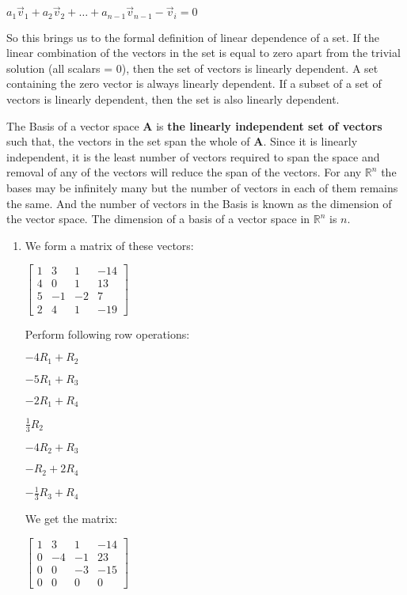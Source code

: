 \documentclass[a4paper, 11pt]{article}
\begin{document}
\begin{enumerate}
\begin{center}
$a_1 \vec v_1 + a_2 \vec v_2 + \dots + a_{n-1} \vec v_{n-1} - \vec v_i = 0$
\end{center} 

So this brings us to the formal definition of linear dependence of a set. If the linear combination of the vectors in the set is equal to zero apart from the trivial solution (all scalars = 0), then the set of vectors is linearly dependent. A set containing the zero vector is always linearly dependent. If a subset of a set of vectors is linearly dependent, then the set is also linearly dependent. \cite{LinInd}

The Basis of a vector space $\textbf{A}$ is \textbf{the linearly independent set of vectors} such that, the vectors in the set span the whole of $\textbf{A}$. Since it is linearly independent, it is the least number of vectors required to span the space and removal of any of the vectors will reduce the span of the vectors. For any $\mathds{R}^n$ the bases may be infinitely many but the number of vectors in each of them remains the same. And the number of vectors in the Basis is known as the dimension of the vector space. The dimension of a basis of a vector space in $\mathds{R}^n$ is $n$. \cite{dimBases}

\begin{enumerate}[label=\alph*)]
\item 
We form a matrix of these vectors: 

$
\begin{bmatrix}
1 & 3 & 1 & -14 \\
4 & 0 & 1 & 13 \\
5 & -1 & - 2 & 7 \\
2 & 4 & 1 & -19
\end{bmatrix}
$

Perform following row operations: 

\begin{center}
$-4R_1 + R_2 $

$-5R_1 + R_3$

$-2R_1 + R_4$

$\frac{1}{3} R_2$

$-4R_2 + R_3$

$-R_2 + 2R_4$

$-\frac{1}{3}R_3 + R_4$
\end{center}

We get the matrix:

$
\begin{bmatrix}
1 & 3 & 1 & -14 \\
0 & -4 & -1 & 23 \\
0 & 0 & - 3 & -15 \\
0 & 0 & 0 & 0
\end{bmatrix}
$ 


\end{enumerate}
\end{enumerate}
\end{document}
